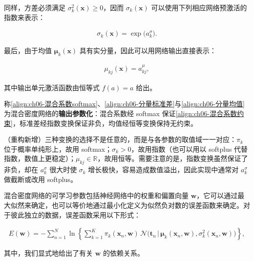 \documentclass[../../main.tex]{subfiles}
\begin{document}
同样，方差必须满足 $\sigma_k^{2}(\boldsymbol{x})\geqslant0$，因而 $\sigma_k(\boldsymbol{x})$ 可以使用下列相应网络预激活的指数来表示：

\begin{align}
\sigma_k(\boldsymbol{x})=\exp\bigl(a_k^{\sigma}\bigr).
\label{align:ch06-分量标准差}
\end{align}

最后，由于均值 $\boldsymbol{\mu}_k(\boldsymbol{x})$ 具有实分量，因此可以用网络输出直接表示：

\begin{align}
\mu_{kj}(\boldsymbol{x})=a_{kj}^{\mu},
\label{align:ch06-分量均值}
\end{align}

其中输出单元激活函数由恒等式 $f(a)=a$ 给出。

\begin{definition}\label{definition:ch06-MDN参数化}
称\eqref{align:ch06-混合系数softmax}、\eqref{align:ch06-分量标准差}与\eqref{align:ch06-分量均值}为混合密度网络的\textbf{输出参数化}：混合系数经 softmax 保证\eqref{align:ch06-混合系数约束}，标准差经指数变换保证非负，均值经恒等变换保持无约束。
\end{definition}

\begin{remark}（重构新增）三种变换的选择不是任意的，而是与各参数的取值域一一对应：$\pi_k$ 位于概率单纯形上，故用 softmax；$\sigma_k>0$，故用指数（也可以用以 softplus 代替指数，数值上更稳定）；$\mu_{kj}\in\mathbb{R}$，故用恒等。需要注意的是，指数变换虽然保证了非负，却在 $a_k^{\sigma}$ 很大时使 $\sigma_k$ 增长极快，容易造成数值溢出，因此实现中通常对 $a_k^{\sigma}$ 做截断或改用 softplus。
\end{remark}

混合密度网络的可学习参数包括神经网络中的权重和偏置向量 $\boldsymbol{w}$，它可以通过最大似然来确定，也可以等价地通过最小化定义为似然负对数的误差函数来确定。对于彼此独立的数据，误差函数采用以下形式：

\begin{align}
E(\boldsymbol{w})=-\sum_{n=1}^{N}\ln\left\{\sum_{k=1}^{K}\pi_k(\boldsymbol{x}_n,\boldsymbol{w})\,\mathcal{N}\bigl(\boldsymbol{t}_n\,\big|\,\boldsymbol{\mu}_k(\boldsymbol{x}_n,\boldsymbol{w}),\sigma_k^{2}(\boldsymbol{x}_n,\boldsymbol{w})\bigr)\right\},
\label{align:ch06-混合密度误差}
\end{align}

其中，我们显式地给出了有关 $\boldsymbol{w}$ 的依赖关系。
\end{document}
